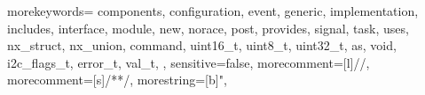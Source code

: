 \setlength{\parindent}{2em}
\renewcommand{\lstlistingname}{\wuhao 源码}
\renewcommand\thelstlisting{\arabic{chapter}-\arabic{lstlisting}}

\setlength{\headheight}{24pt}

\newfontfamily{}
\newfontfamily{}

 {
	morekeywords= {
		components, configuration, event, generic,
		implementation, includes, interface, module,
		new, norace, post, provides, signal, task,
		uses, nx\_struct, nx\_union, command,
		uint16\_t, uint8\_t, uint32\_t, as, void,
		i2c\_flags\_t, error\_t, val\_t,
	},
	sensitive=false,
	morecomment=[l]{//},
	morecomment=[s]{/*}{*/},
	morestring=[b]",
}


\renewcommand\arraystretch{1.25}


\renewcommand{\ALG@name}{算法}
\renewcommand\thealgorithm{\arabic{chapter}-\arabic{algorithm}}
\renewcommand{\algorithmicrequire}{\textbf{Input:}}
\renewcommand{\algorithmicensure}{\textbf{Output:}} 